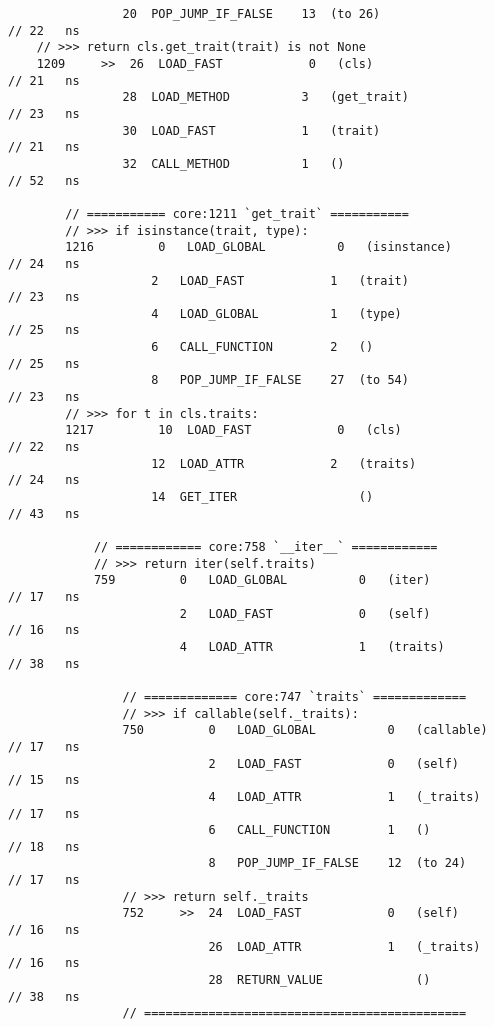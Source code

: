 \begin{code}
\begin{verbatim}
                20  POP_JUMP_IF_FALSE    13  (to 26)                                        // 22   ns
    // >>> return cls.get_trait(trait) is not None
    1209     >>  26  LOAD_FAST            0   (cls)                                         // 21   ns
                28  LOAD_METHOD          3   (get_trait)                                    // 23   ns
                30  LOAD_FAST            1   (trait)                                        // 21   ns
                32  CALL_METHOD          1   ()                                             // 52   ns

        // =========== core:1211 `get_trait` ===========
        // >>> if isinstance(trait, type):
        1216         0   LOAD_GLOBAL          0   (isinstance)                              // 24   ns
                    2   LOAD_FAST            1   (trait)                                    // 23   ns
                    4   LOAD_GLOBAL          1   (type)                                     // 25   ns
                    6   CALL_FUNCTION        2   ()                                         // 25   ns
                    8   POP_JUMP_IF_FALSE    27  (to 54)                                    // 23   ns
        // >>> for t in cls.traits:
        1217         10  LOAD_FAST            0   (cls)                                     // 22   ns
                    12  LOAD_ATTR            2   (traits)                                   // 24   ns
                    14  GET_ITER                 ()                                         // 43   ns

            // ============ core:758 `__iter__` ============
            // >>> return iter(self.traits)
            759         0   LOAD_GLOBAL          0   (iter)                                 // 17   ns
                        2   LOAD_FAST            0   (self)                                 // 16   ns
                        4   LOAD_ATTR            1   (traits)                               // 38   ns

                // ============= core:747 `traits` =============
                // >>> if callable(self._traits):
                750         0   LOAD_GLOBAL          0   (callable)                         // 17   ns
                            2   LOAD_FAST            0   (self)                             // 15   ns
                            4   LOAD_ATTR            1   (_traits)                          // 17   ns
                            6   CALL_FUNCTION        1   ()                                 // 18   ns
                            8   POP_JUMP_IF_FALSE    12  (to 24)                            // 17   ns
                // >>> return self._traits
                752     >>  24  LOAD_FAST            0   (self)                             // 16   ns
                            26  LOAD_ATTR            1   (_traits)                          // 16   ns
                            28  RETURN_VALUE             ()                                 // 38   ns
                // =============================================


\end{verbatim}
\end{code}
